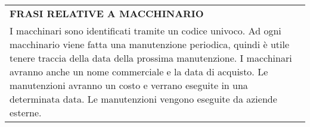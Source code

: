 \begin{center}
	\begin{tabular}{P{16cm}}
		\toprule
		 \textbf {\large {FRASI RELATIVE A MACCHINARIO}} \\
		I macchinari sono identificati tramite un codice univoco. Ad ogni macchinario viene fatta una manutenzione periodica, quindi è utile tenere traccia della data della prossima manutenzione. I macchinari avranno anche un nome commerciale e la data di acquisto. Le manutenzioni avranno un costo e verrano eseguite in una determinata data. Le manutenzioni vengono eseguite da aziende esterne.\\
		\bottomrule
	\end{tabular}
	
\end{center}